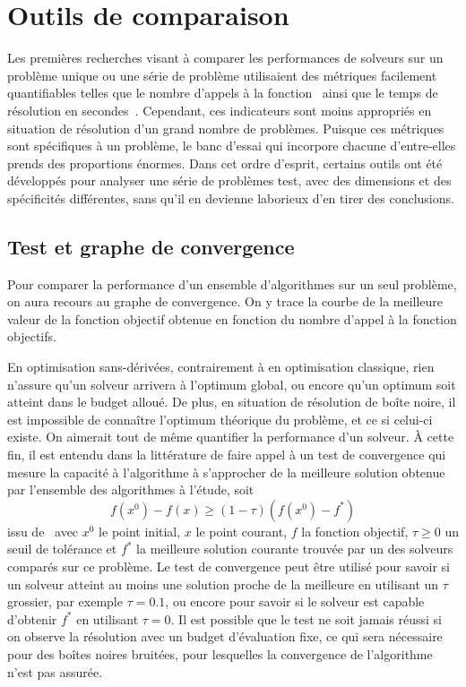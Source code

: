 \label{sec:Theme3}
\section{Outils de comparaison}\label{sec:out}
Les premières recherches visant à comparer les performances de solveurs sur un problème unique ou une série de problème utilisaient des métriques facilement quantifiables telles que le nombre d'appels à la fonction~\cite{BoCoGoTo1995} ainsi que le temps de résolution en secondes~\cite{Mi99}. Cependant, ces indicateurs sont moins appropriés en situation de résolution d'un grand nombre de problèmes. Puisque ces métriques sont spécifiques à un problème, le banc d'essai qui incorpore chacune d'entre-elles prends des proportions énormes. Dans cet ordre d'esprit, certains outils ont été développés pour analyser une série de problèmes test, avec des dimensions et des spécificités différentes, sans qu'il en devienne laborieux d'en tirer des conclusions.
\subsection{Test et graphe de convergence}\label{sec:con}
Pour comparer la performance d'un ensemble d'algorithmes sur un seul problème, on aura recours au graphe de convergence. On y trace la courbe de la meilleure valeur de la fonction objectif obtenue en fonction du nombre d'appel à la fonction objectifs.

En optimisation sans-dérivées, contrairement à  en optimisation classique, rien n'assure qu'un solveur arrivera à l'optimum global, ou encore qu'un optimum soit atteint dans le budget alloué. De plus, en situation de résolution de boîte noire, il est impossible de connaître l'optimum théorique du problème, et ce si celui-ci existe. On aimerait tout de même quantifier la performance d'un solveur.  À cette fin, il est entendu dans la littérature de faire appel à un test de convergence qui mesure la capacité à l'algorithme à s'approcher de la meilleure solution obtenue par l'ensemble des algorithmes à l'étude, soit 
\begin{equation*}
f(x^0) - f(x) \geq (1-\tau)(f(x^0)-f^*)
\end{equation*}
issu de~\cite{MaNo02a} avec $x^0$ le point initial, $x$ le point courant, $f$ la fonction objectif, $\tau\geq0$ un seuil de tolérance et $f^*$ la meilleure solution courante trouvée par un des solveurs comparés sur ce problème. Le test de convergence peut être utilisé pour savoir si un solveur atteint au moins une solution proche de la meilleure en utilisant un $\tau$ grossier, par exemple $\tau = 0.1$, ou encore pour savoir si le solveur est capable d'obtenir $f^*$ en utilisant $\tau =0$. Il est possible que le test ne soit jamais réussi si on observe la résolution avec un budget d'évaluation fixe, ce qui sera nécessaire pour des boîtes noires bruitées, pour lesquelles la convergence de l'algorithme n'est pas assurée.

